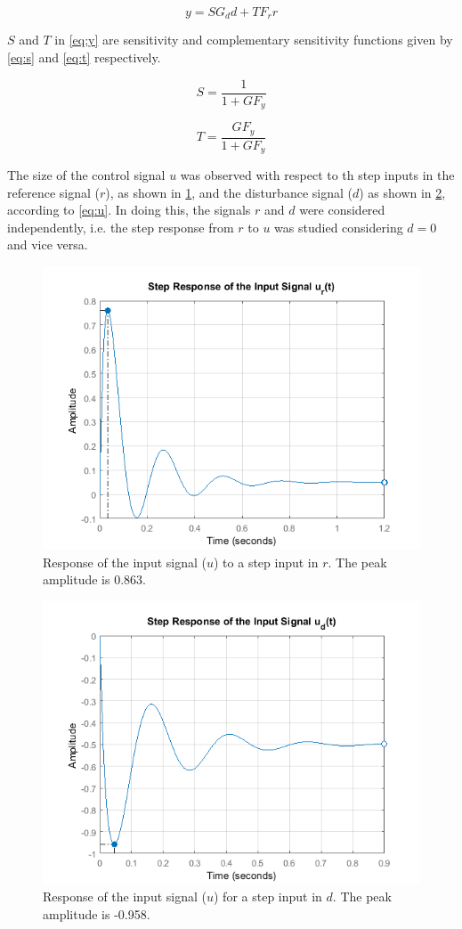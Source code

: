 \documentclass[a4paper]{article}
\begin{document}
\begin{equation}
y=SG_dd + TF_rr
\label{eq:y}
\end{equation}

$S$ and $T$ in \cref{eq:y} are sensitivity and complementary sensitivity functions given by \cref{eq:s} and \cref{eq:t} respectively.

\begin{equation}
S=\frac{1}{1+GF_y}
\label{eq:s}
\end{equation}

\begin{equation}
T=\frac{GF_y}{1+GF_y}
\label{eq:t}
\end{equation}

The size of the control signal $u$ was observed with respect to th step inputs in the reference signal ($r$), as shown in \cref{fig:stepresponse_utor}, and the disturbance signal ($d$) as shown in \cref{fig:stepresponse_utod}, according to \cref{eq:u}. In doing this, the signals $r$ and $d$ were considered independently, i.e. the step response from $r$ to $u$ was studied considering $d=0$ and vice versa. 

\begin{figure}[!ht]
\centering
\includegraphics[width=.8\linewidth]{ur_423}
\caption{Response of the input signal ($u$) to a step input in $r$. The peak amplitude is 0.863.}
\label{fig:stepresponse_utor}
\end{figure}

\begin{figure}[!ht]
\centering
\includegraphics[width=.8\linewidth]{ud_423}
\caption{Response of the input signal ($u$) for a step input in $d$. The peak amplitude is -0.958.}
\label{fig:stepresponse_utod}
\end{figure}
\end{document}
